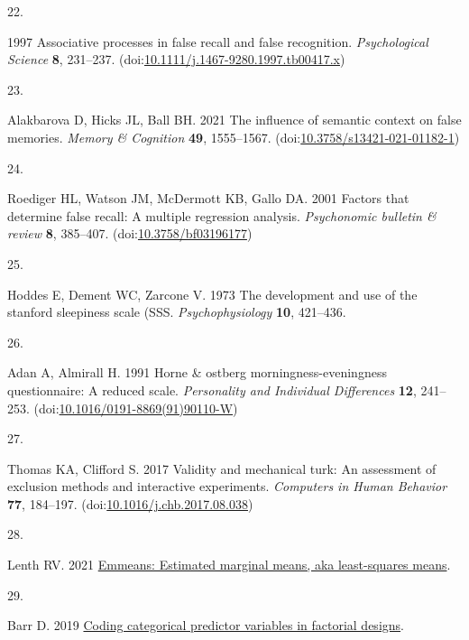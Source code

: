 \documentclass[
]{article}
\newlength{\cslhangindent}
\newlength{\csllabelwidth}
\newlength{\cslentryspacingunit} %
\newenvironment{CSLReferences}[2] %
 {%
  \setlength{\parindent}{0pt}
  \ifodd #1
  \let\oldpar\par
  \def\par{\hangindent=\cslhangindent\oldpar}
  \fi
  \setlength{\parskip}{#2\cslentryspacingunit}
 }%
 {}
\newcommand{\CSLLeftMargin}[1]{\parbox[t]{\csllabelwidth}{#1}}
\newcommand{\CSLRightInline}[1]{\parbox[t]{\linewidth - \csllabelwidth}{#1}\break}
\begin{document}
\begin{CSLReferences}{0}{0}
\leavevmode{}%
\CSLLeftMargin{22. }%
\CSLRightInline{1997 Associative processes in false recall and false recognition. \emph{Psychological Science} \textbf{8}, 231--237. (doi:\href{https://doi.org/10.1111/j.1467-9280.1997.tb00417.x}{10.1111/j.1467-9280.1997.tb00417.x})}

\leavevmode{}%
\CSLLeftMargin{23. }%
\CSLRightInline{Alakbarova D, Hicks JL, Ball BH. 2021 The influence of semantic context on false memories. \emph{Memory \& Cognition} \textbf{49}, 1555--1567. (doi:\href{https://doi.org/10.3758/s13421-021-01182-1}{10.3758/s13421-021-01182-1})}

\leavevmode{}%
\CSLLeftMargin{24. }%
\CSLRightInline{Roediger HL, Watson JM, McDermott KB, Gallo DA. 2001 Factors that determine false recall: A multiple regression analysis. \emph{Psychonomic bulletin \& review} \textbf{8}, 385--407. (doi:\href{https://doi.org/10.3758/bf03196177}{10.3758/bf03196177})}

\leavevmode{}%
\CSLLeftMargin{25. }%
\CSLRightInline{Hoddes E, Dement WC, Zarcone V. 1973 The development and use of the stanford sleepiness scale (SSS. \emph{Psychophysiology} \textbf{10}, 421--436.}

\leavevmode{}%
\CSLLeftMargin{26. }%
\CSLRightInline{Adan A, Almirall H. 1991 Horne \& ostberg morningness-eveningness questionnaire: A reduced scale. \emph{Personality and Individual Differences} \textbf{12}, 241--253. (doi:\href{https://doi.org/10.1016/0191-8869(91)90110-W}{10.1016/0191-8869(91)90110-W})}

\leavevmode{}%
\CSLLeftMargin{27. }%
\CSLRightInline{Thomas KA, Clifford S. 2017 Validity and mechanical turk: An assessment of exclusion methods and interactive experiments. \emph{Computers in Human Behavior} \textbf{77}, 184--197. (doi:\href{https://doi.org/10.1016/j.chb.2017.08.038}{10.1016/j.chb.2017.08.038})}

\leavevmode{}%
\CSLLeftMargin{28. }%
\CSLRightInline{Lenth RV. 2021 \href{https://CRAN.R-project.org/package=emmeans}{Emmeans: Estimated marginal means, aka least-squares means}. }

\leavevmode{}%
\CSLLeftMargin{29. }%
\CSLRightInline{Barr D. 2019 \href{https://talklab.psy.gla.ac.uk/tvw/catpred/}{Coding categorical predictor variables in factorial designs}. }


\end{CSLReferences}
\end{document}
